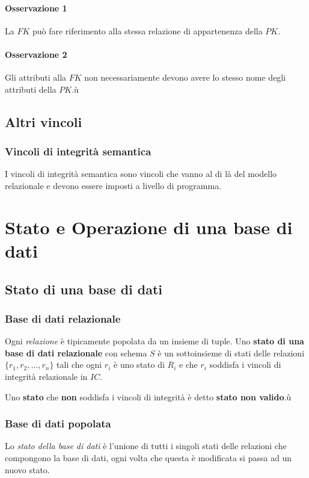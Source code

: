         \paragraph{Osservazione 1} La $ FK $ può fare riferimento alla stessa relazione di appartenenza della $ PK $.
        \paragraph{Osservazione 2} Gli attributi alla $ FK $ non necessariamente devono avere lo stesso nome degli attributi della $ PK $.ù
    \subsection{Altri vincoli}
        \subsubsection{Vincoli di integrità semantica}
            I vincoli di integrità semantica sono vincoli che vanno al di là del modello relazionale e devono essere imposti a livello di programma.
\section{Stato e Operazione di una base di dati}
    \subsection{Stato di una base di dati}
        \subsubsection{Base di dati relazionale}
            Ogni \textit{relazione} è tipicamente popolata da un insieme di tuple. Uno \textbf{stato di una base di dati relazionale} con schema $ S $ è un sottoinsieme di stati delle relazioni $ \{ r_1, r_2, \dots, r_n \} $ tali che ogni $ r_i $ è uno stato di $ R_i $ e che $ r_i $ soddisfa i vincoli di integrità relazionale in $ IC $.

            Uno \textbf{stato} che \textbf{non} soddisfa i vincoli di integrità è detto \textbf{stato non valido}.ù
        \subsubsection{Base di dati popolata}
            Lo \textit{stato della base di dati} è l'unione di tutti i singoli stati delle relazioni che compongono la base di dati, ogni volta che questa è modificata si passa ad un nuovo stato.
